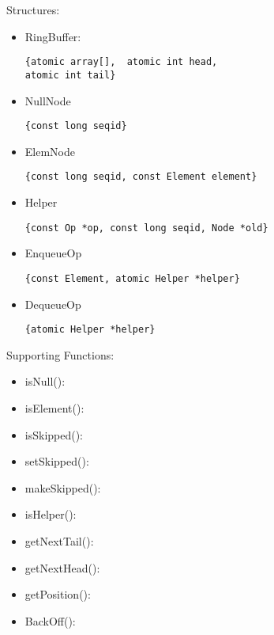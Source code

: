 
Structures:
\begin{itemize}

\item RingBuffer:
\begin{lstlisting}
{atomic array[],  atomic int head,
atomic int tail}
\end{lstlisting}

\item NullNode
\begin{lstlisting}
{const long seqid}
\end{lstlisting}

\item ElemNode
\begin{lstlisting}
{const long seqid, const Element element}
\end{lstlisting}

\item Helper
\begin{lstlisting}
{const Op *op, const long seqid, Node *old}
\end{lstlisting}

\item EnqueueOp
\begin{lstlisting}
{const Element, atomic Helper *helper}
\end{lstlisting}

\item DequeueOp
\begin{lstlisting}
{atomic Helper *helper}
\end{lstlisting}

\end{itemize}

Supporting Functions:
\begin{itemize}
\item isNull():
\item isElement():
\item isSkipped():
\item setSkipped():
\item makeSkipped():
\item isHelper():
\item getNextTail():
\item getNextHead():
\item getPosition():
\item BackOff():
\end{itemize}




